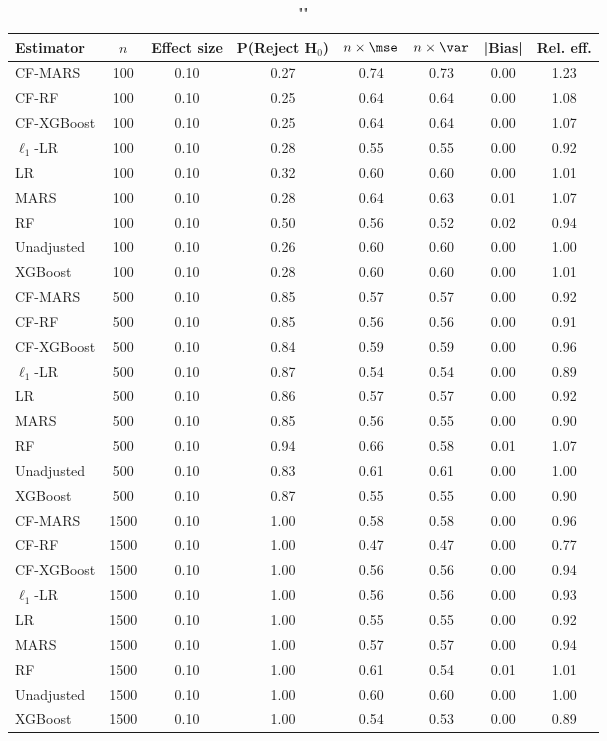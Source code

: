 \begin{table}
\centering
\caption{""}
\begin{tabular}{lccccccc}
\toprule
Estimator & $n$ & Effect size & P(Reject H$_0$) & $n\times\mse$ & $n\times \var$ & |Bias| & Rel. eff.\\ \midrule
CF-MARS & 100 & 0.10 & 0.27 & 0.74 & 0.73 & 0.00 & 1.23 \\ 
CF-RF & 100 & 0.10 & 0.25 & 0.64 & 0.64 & 0.00 & 1.08 \\ 
CF-XGBoost & 100 & 0.10 & 0.25 & 0.64 & 0.64 & 0.00 & 1.07 \\ 
$\ell_1$-LR & 100 & 0.10 & 0.28 & 0.55 & 0.55 & 0.00 & 0.92 \\ 
LR & 100 & 0.10 & 0.32 & 0.60 & 0.60 & 0.00 & 1.01 \\ 
MARS & 100 & 0.10 & 0.28 & 0.64 & 0.63 & 0.01 & 1.07 \\ 
RF & 100 & 0.10 & 0.50 & 0.56 & 0.52 & 0.02 & 0.94 \\ 
Unadjusted & 100 & 0.10 & 0.26 & 0.60 & 0.60 & 0.00 & 1.00 \\ 
XGBoost & 100 & 0.10 & 0.28 & 0.60 & 0.60 & 0.00 & 1.01 \\ \addlinespace 
CF-MARS & 500 & 0.10 & 0.85 & 0.57 & 0.57 & 0.00 & 0.92 \\ 
CF-RF & 500 & 0.10 & 0.85 & 0.56 & 0.56 & 0.00 & 0.91 \\ 
CF-XGBoost & 500 & 0.10 & 0.84 & 0.59 & 0.59 & 0.00 & 0.96 \\ 
$\ell_1$-LR & 500 & 0.10 & 0.87 & 0.54 & 0.54 & 0.00 & 0.89 \\ 
LR & 500 & 0.10 & 0.86 & 0.57 & 0.57 & 0.00 & 0.92 \\ 
MARS & 500 & 0.10 & 0.85 & 0.56 & 0.55 & 0.00 & 0.90 \\ 
RF & 500 & 0.10 & 0.94 & 0.66 & 0.58 & 0.01 & 1.07 \\ 
Unadjusted & 500 & 0.10 & 0.83 & 0.61 & 0.61 & 0.00 & 1.00 \\ 
XGBoost & 500 & 0.10 & 0.87 & 0.55 & 0.55 & 0.00 & 0.90 \\ \addlinespace 
CF-MARS & 1500 & 0.10 & 1.00 & 0.58 & 0.58 & 0.00 & 0.96 \\ 
CF-RF & 1500 & 0.10 & 1.00 & 0.47 & 0.47 & 0.00 & 0.77 \\ 
CF-XGBoost & 1500 & 0.10 & 1.00 & 0.56 & 0.56 & 0.00 & 0.94 \\ 
$\ell_1$-LR & 1500 & 0.10 & 1.00 & 0.56 & 0.56 & 0.00 & 0.93 \\ 
LR & 1500 & 0.10 & 1.00 & 0.55 & 0.55 & 0.00 & 0.92 \\ 
MARS & 1500 & 0.10 & 1.00 & 0.57 & 0.57 & 0.00 & 0.94 \\ 
RF & 1500 & 0.10 & 1.00 & 0.61 & 0.54 & 0.01 & 1.01 \\ 
Unadjusted & 1500 & 0.10 & 1.00 & 0.60 & 0.60 & 0.00 & 1.00 \\ 
XGBoost & 1500 & 0.10 & 1.00 & 0.54 & 0.53 & 0.00 & 0.89 \\
\bottomrule
\end{tabular}
\end{table}

